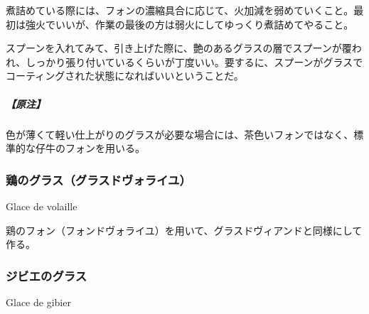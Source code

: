 \begin{recette}
煮詰めている際には、フォンの濃縮具合に応じて、火加減を弱めていくこと。最初は強火でいいが、作業の最後の方は弱火にしてゆっくり煮詰めてやること。

スプーンを入れてみて、引き上げた際に、艶のあるグラスの層でスプーンが覆われ、しっかり張り付いているくらいが丁度いい。要するに、スプーンがグラスでコーティングされた状態になればいいということだ。

\hypertarget{nota-glace-de-viande}{%
\subparagraph{【原注】}\label{nota-glace-de-viande}}

色が薄くて軽い仕上がりのグラスが必要な場合には、茶色いフォンではなく、標準的な仔牛のフォンを用いる。

\atoaki{}

\hypertarget{glace-de-volaille}{%
\subsubsection{鶏のグラス（グラスドヴォライユ）}\label{glace-de-volaille}}

\begin{frsubenv}

Glace de volaille

\end{frsubenv}


鶏のフォン（フォンドヴォライユ）を用いて、グラスドヴィアンドと同様にして作る。

\atoaki{}

\hypertarget{glace-de-gibier}{%
\subsubsection{ジビエのグラス}\label{glace-de-gibier}}

\begin{frsubenv}

Glace de gibier

\end{frsubenv}



\end{recette}
